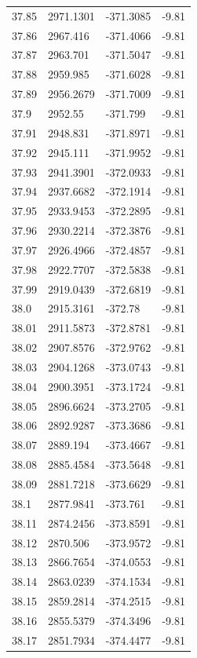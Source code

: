 \begin{table}[H]
\begin{tabular}{llll}
37.85 & 2971.1301 & -371.3085 & -9.81 \\
37.86 & 2967.416 & -371.4066 & -9.81 \\
37.87 & 2963.701 & -371.5047 & -9.81 \\
37.88 & 2959.985 & -371.6028 & -9.81 \\
37.89 & 2956.2679 & -371.7009 & -9.81 \\
37.9 & 2952.55 & -371.799 & -9.81 \\
37.91 & 2948.831 & -371.8971 & -9.81 \\
37.92 & 2945.111 & -371.9952 & -9.81 \\
37.93 & 2941.3901 & -372.0933 & -9.81 \\
37.94 & 2937.6682 & -372.1914 & -9.81 \\
37.95 & 2933.9453 & -372.2895 & -9.81 \\
37.96 & 2930.2214 & -372.3876 & -9.81 \\
37.97 & 2926.4966 & -372.4857 & -9.81 \\
37.98 & 2922.7707 & -372.5838 & -9.81 \\
37.99 & 2919.0439 & -372.6819 & -9.81 \\
38.0 & 2915.3161 & -372.78 & -9.81 \\
38.01 & 2911.5873 & -372.8781 & -9.81 \\
38.02 & 2907.8576 & -372.9762 & -9.81 \\
38.03 & 2904.1268 & -373.0743 & -9.81 \\
38.04 & 2900.3951 & -373.1724 & -9.81 \\
38.05 & 2896.6624 & -373.2705 & -9.81 \\
38.06 & 2892.9287 & -373.3686 & -9.81 \\
38.07 & 2889.194 & -373.4667 & -9.81 \\
38.08 & 2885.4584 & -373.5648 & -9.81 \\
38.09 & 2881.7218 & -373.6629 & -9.81 \\
38.1 & 2877.9841 & -373.761 & -9.81 \\
38.11 & 2874.2456 & -373.8591 & -9.81 \\
38.12 & 2870.506 & -373.9572 & -9.81 \\
38.13 & 2866.7654 & -374.0553 & -9.81 \\
38.14 & 2863.0239 & -374.1534 & -9.81 \\
38.15 & 2859.2814 & -374.2515 & -9.81 \\
38.16 & 2855.5379 & -374.3496 & -9.81 \\
38.17 & 2851.7934 & -374.4477 & -9.81 \\

\end{tabular}
\end{table}
